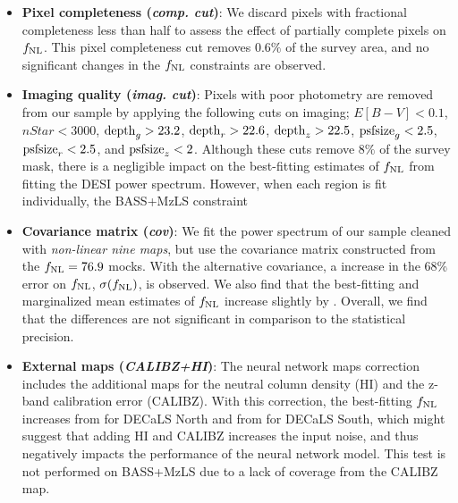 \begin{itemize}[itemindent=*]
\item \textbf{Pixel completeness (\textit{comp. cut})}: We discard pixels with fractional completeness less than half to assess the effect of partially complete pixels on $f_{\rm NL}$. This pixel completeness cut removes $0.6\%$ of the survey area, and no significant changes in the $f_{\rm NL}$ constraints are observed.

\item \textbf{Imaging quality (\textit{imag. cut})}: Pixels with poor photometry are removed from our sample by applying the following cuts on imaging; $E[B-V]<0.1$, $nStar < 3000$, ${\rm depth}_{g} > 23.2$, ${\rm depth}_{r} > 22.6$, ${\rm depth}_{z} > 22.5$, ${\rm psfsize}_{g}<2.5$, ${\rm psfsize}_{r}<2.5$, and ${\rm psfsize}_{z}<2$. Although these cuts remove $8\%$ of the survey mask, there is a negligible impact on the best-fitting estimates of $f_{\rm NL}$ from fitting the DESI power spectrum. However, when each region is fit individually, the BASS+MzLS constraint   

\item \textbf{Covariance matrix (\textit{cov})}: We fit the power spectrum of our sample cleaned with \textit{non-linear nine maps}, but use the covariance matrix constructed from the $f_{\rm NL}=76.9$ mocks. With the alternative covariance, a  increase in the 68\% error on $f_{\rm NL}$, $\sigma(f_{\rm NL})$, is observed. We also find that the best-fitting and marginalized mean estimates of $f_{\rm NL}$ increase slightly by . Overall, we find that the differences are not significant in comparison to the statistical precision.

\item \textbf{External maps (\textit{CALIBZ+HI})}: The neural network  maps correction includes the additional maps for the neutral column density (HI) and the z-band calibration error (CALIBZ). With this correction, the best-fitting $f_{\rm NL}$ increases from  for DECaLS North and from  for DECaLS South, which might suggest that adding HI and CALIBZ increases the input noise, and thus negatively impacts the performance of the neural network model. This test is not performed on BASS+MzLS due to a lack of coverage from the CALIBZ map. 


\end{itemize}
